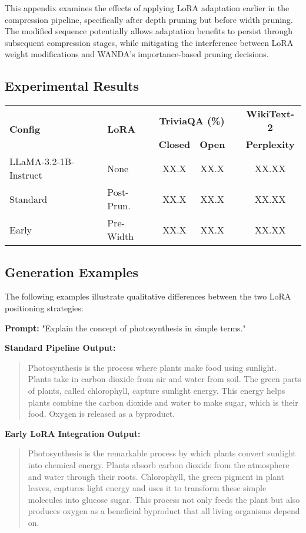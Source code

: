 This appendix examines the effects of applying LoRA adaptation earlier in the compression pipeline, specifically after depth pruning but before width pruning. The modified sequence potentially allows adaptation benefits to persist through subsequent compression stages, while mitigating the interference between LoRA weight modifications and WANDA's importance-based pruning decisions.

\subsection{Experimental Results}
\begin{center}
\label{tab:lora_positioning}
\small
\begin{tabular}{llcccc}
\hline
\multirow{2}{*}{\textbf{Config}} & \multirow{2}{*}{\textbf{LoRA}} & \multicolumn{2}{c}{\textbf{TriviaQA (\%)}} & & \textbf{WikiText-2} \\
\cline{3-4}
& & \textbf{Closed} & \textbf{Open} & & \textbf{Perplexity} \\
\hline
LLaMA-3.2-1B-Instruct & None & XX.X & XX.X & & XX.XX \\
Standard & Post-Prun. & XX.X & XX.X & & XX.XX \\
Early & Pre-Width & XX.X & XX.X & & XX.XX \\
\hline
\end{tabular}
\end{center}

\subsection{Generation Examples}

The following examples illustrate qualitative differences between the two LoRA positioning strategies:

\textbf{Prompt:} "Explain the concept of photosynthesis in simple terms."

\textbf{Standard Pipeline Output:}
\begin{quote}
Photosynthesis is the process where plants make food using sunlight. Plants take in carbon dioxide from air and water from soil. The green parts of plants, called chlorophyll, capture sunlight energy. This energy helps plants combine the carbon dioxide and water to make sugar, which is their food. Oxygen is released as a byproduct.
\end{quote}

\textbf{Early LoRA Integration Output:}
\begin{quote}
Photosynthesis is the remarkable process by which plants convert sunlight into chemical energy. Plants absorb carbon dioxide from the atmosphere and water through their roots. Chlorophyll, the green pigment in plant leaves, captures light energy and uses it to transform these simple molecules into glucose sugar. This process not only feeds the plant but also produces oxygen as a beneficial byproduct that all living organisms depend on.
\end{quote}

